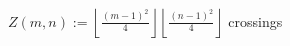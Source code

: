\documentclass[preview]{standalone}
\begin{document}
\begin{center}
$Z(m,n) := \left\lfloor\frac{(m-1)^2}{4}\right\rfloor \left\lfloor\frac{(n-1)^2}{4}\right\rfloor$ crossings
\end{center}
\end{document}
